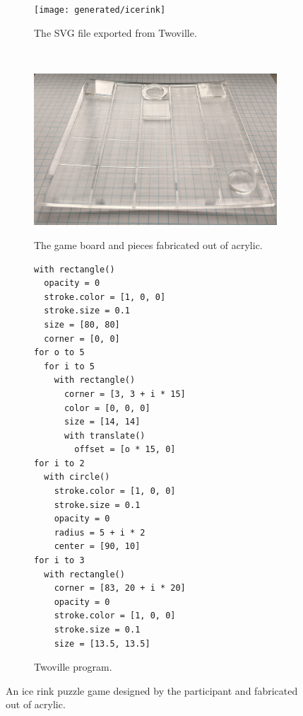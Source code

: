 \begin{figure}
\hfill
\begin{minipage}{0.58\linewidth}%
\begin{subfigure}{\linewidth}%
\begin{minipage}{\linewidth}%
\centering
\texttt{[image: generated/icerink]}%
\end{minipage}
\label{figure:icerink_svg}
\caption{The SVG file exported from Twoville.}
\end{subfigure}%
\vspace{1em}
\\
\begin{subfigure}{\linewidth}
\includegraphics[width=\linewidth]{pixels/icerink-acrylic}%
\label{figure:icerink_photo}
\caption{The game board and pieces fabricated out of acrylic.}
\end{subfigure}%
\end{minipage}%
\hfill
\begin{subfigure}{0.35\linewidth}%
\begin{minipage}{\linewidth}%
\begin{Verbatim}
with rectangle()
  opacity = 0
  stroke.color = [1, 0, 0]
  stroke.size = 0.1
  size = [80, 80]
  corner = [0, 0]
for o to 5
  for i to 5
    with rectangle()
      corner = [3, 3 + i * 15]
      color = [0, 0, 0]
      size = [14, 14]
      with translate()
        offset = [o * 15, 0]
for i to 2  
  with circle()
    stroke.color = [1, 0, 0]
    stroke.size = 0.1
    opacity = 0
    radius = 5 + i * 2
    center = [90, 10]
for i to 3
  with rectangle()
    corner = [83, 20 + i * 20]
    opacity = 0
    stroke.color = [1, 0, 0]
    stroke.size = 0.1
    size = [13.5, 13.5]
\end{Verbatim}
\end{minipage}%
\label{figure:icerink_code}
\caption{Twoville program.}
\end{subfigure}%
\hfill
\caption{An ice rink puzzle game designed by the participant and fabricated out of acrylic.}
\label{figure:icerink}
\end{figure}

